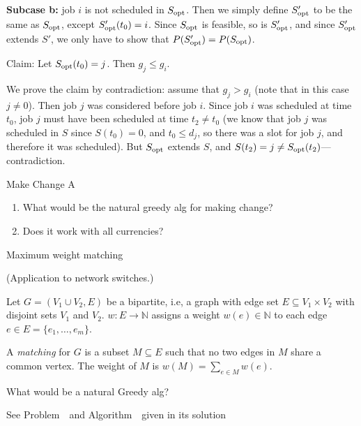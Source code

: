 \begin{frame}
\noindent\textbf{Subcase b:} job $i$ is not scheduled in $S_{\mathrm{opt}}$. Then
we simply define $S_{\mathrm{opt}}'$ to be the same as $S_{\mathrm{opt}}$, except
$S_{\mathrm{opt}}'(t_0)=i$. Since $S_{\mathrm{opt}}$ is feasible, so is $S_{\mathrm{opt}}'$, and since
$S_{\mathrm{opt}}'$ extends $S'$, we only have to show that $P(S_{\mathrm{opt}}')=P(S_{\mathrm{opt}})$.


Claim: Let $S_{\mathrm{opt}}(t_0)=j$. Then $g_j\leq g_i$.
\end{frame}

\begin{frame}
We prove the claim by contradiction: assume that $g_j>g_i$ (note that
in this case $j\neq 0$). Then job $j$ was considered before job
$i$. Since job $i$ was scheduled at time $t_0$, job $j$ must have been
scheduled at time $t_2\neq t_0$ (we know that job $j$ was scheduled in
$S$ since $S(t_0)=0$, and $t_0\leq d_j$, so there was a slot for job
$j$, and therefore it was scheduled). But $S_{\mathrm{opt}}$ extends $S$, and
$S(t_2)=j\neq S_{\mathrm{opt}}(t_2)$---contradiction.
\end{frame}

\begin{frame}
{Make Change A\fi}

\begin{enumerate}
\item What would be the natural greedy alg for making change?
\item Does it work with all currencies?
\end{enumerate}

\end{frame}

\begin{frame}
{Maximum weight matching}

(Application to network switches.)

Let $G=(V_1\cup V_2,E)$ be a bipartite,
i.e, a graph with edge set $E\subseteq V_1\times V_2$ with disjoint sets
$V_1$ and $V_2$. $w:E\longrightarrow\mathbb{N}$ assigns a weight
$w(e)\in\mathbb{N}$ to each edge $e\in E=\{e_1,\ldots,e_m\}$.  

A {\em
matching} for $G$ is a subset $M\subseteq E$
such that no two edges in $M$ share a common vertex.  The weight of $M$ is
$w(M)=\sum_{e\in M}w(e)$.

What would be a natural Greedy alg?

\pause
See Problem~\fi\ and Algorithm~\fi\ given in its solution
\end{frame}

